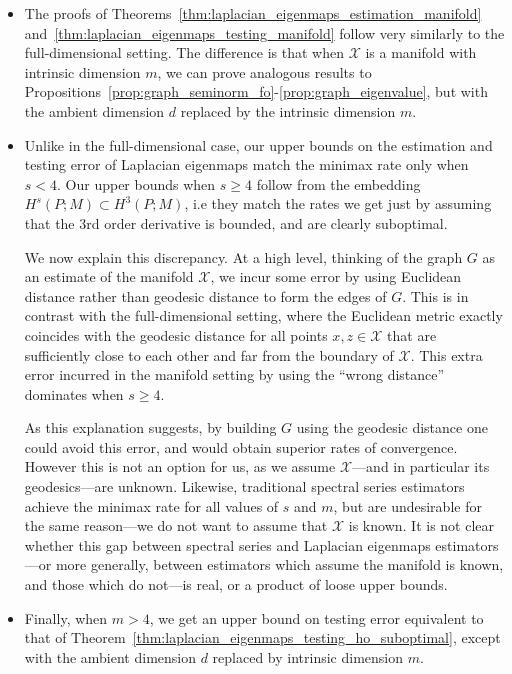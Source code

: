 \documentclass{article}
\newcommand{\1}{\mathbf{1}}
\newcommand{\mc}[1]{\mathcal{#1}}
\theoremstyle{alden}
\theoremstyle{aldenthm}
\theoremstyle{definition}
\theoremstyle{remark}
\begin{document}
\begin{itemize}
	\item The proofs of Theorems~\ref{thm:laplacian_eigenmaps_estimation_manifold} and~\ref{thm:laplacian_eigenmaps_testing_manifold} follow very similarly to the full-dimensional setting. The difference is that when $\mc{X}$ is a manifold with intrinsic dimension $m$, we can prove analogous results to Propositions~\ref{prop:graph_seminorm_fo}-\ref{prop:graph_eigenvalue}, but with the ambient dimension $d$ replaced by the intrinsic dimension $m$. 
	\item Unlike in the full-dimensional case, our upper bounds on the estimation and testing error of Laplacian eigenmaps match the minimax rate only when $s < 4$.  Our upper bounds when $s \geq 4$ follow from the embedding $H^s(P;M) \subset H^{3}(P;M)$, i.e they match the rates we get just by assuming that the $3$rd order derivative is bounded, and are clearly suboptimal.
	
	We now explain this discrepancy. At a high level, thinking of the graph $G$ as an estimate of the manifold $\mc{X}$, we incur some error by using Euclidean distance rather than geodesic distance to form the edges of $G$. This is in contrast with the full-dimensional setting, where the Euclidean metric exactly coincides with the geodesic distance for all points $x,z \in \mc{X}$ that are sufficiently close to each other and far from the boundary of $\mc{X}$. This extra error incurred in the manifold setting by using the ``wrong distance'' dominates when $s \geq 4$. 
	
	As this explanation suggests, by building $G$ using the geodesic distance one could avoid this error, and would obtain superior rates of convergence. However this is not an option for us, as we assume $\mc{X}$---and in particular its geodesics---are unknown. Likewise, traditional spectral series estimators achieve the minimax rate for all values of $s$ and $m$, but are undesirable for the same reason---we do not want to assume that $\mc{X}$ is known. It is not clear whether this gap between spectral series and Laplacian eigenmaps estimators---or more generally, between estimators which assume the manifold is known, and those which do not---is real, or a product of loose upper bounds. 
	
	\item Finally, when $m > 4$, we get an upper bound on testing error equivalent to that of Theorem~\ref{thm:laplacian_eigenmaps_testing_ho_suboptimal}, except with the ambient dimension $d$ replaced by intrinsic dimension $m$.
\end{itemize}
\end{document}
